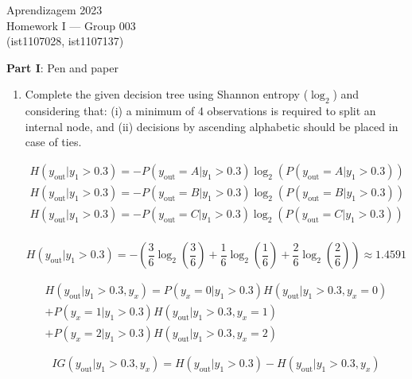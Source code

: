 \documentclass[12pt]{article}
\begin{document}
\begin{center}
Aprendizagem 2023\\
Homework I --- Group 003\\
(ist1107028, ist1107137)\vskip 1cm
\end{center}

\large{\textbf{Part I}: Pen and paper}\normalsize

\begin{enumerate}[leftmargin=\labelsep]
\item Complete the given decision tree using Shannon entropy ($\log_2$) and considering that:
    (i) a minimum of 4 observations is required to split an internal node, and (ii) decisions by ascending alphabetic should be placed in case of ties.

\begin{equation*}
    \begin{split}
        H(y_{\text{out}}|y_1 > 0.3) = - P(y_{\text{out}} = A|y_1 > 0.3)\log_2(P(y_{\text{out}} = A|y_1 > 0.3)) \\
        H(y_{\text{out}}|y_1 > 0.3) = - P(y_{\text{out}} = B|y_1 > 0.3)\log_2(P(y_{\text{out}} = B|y_1 > 0.3)) \\
        H(y_{\text{out}}|y_1 > 0.3) = - P(y_{\text{out}} = C|y_1 > 0.3)\log_2(P(y_{\text{out}} = C|y_1 > 0.3)) \\
    \end{split}
\end{equation*}

\begin{equation*}
    H(y_{\text{out}}|y_1 > 0.3) = - \left( \frac{3}{6} \log_2 \left( \frac{3}{6} \right) + \frac{1}{6} \log_2 \left( \frac{1}{6} \right) + \frac{2}{6} \log_2 \left( \frac{2}{6} \right) \right) \approx  1.4591
\end{equation*}

\begin{equation}
    \begin{split}
    H(y_{\text{out}} | y_1 > 0.3, y_x) = P(y_x = 0 | y_1 > 0.3) H(y_{\text{out}} | y_1 > 0.3, y_x = 0) \\
    + P(y_x = 1 | y_1 > 0.3) H(y_{\text{out}} | y_1 > 0.3, y_x = 1) \\
    + P(y_x = 2 | y_1 > 0.3) H(y_{\text{out}} | y_1 > 0.3, y_x = 2)
    \end{split}
\end{equation}

\begin{equation}
    IG(y_{\text{out}} | y_1 > 0.3, y_x) = H(y_{\text{out}} | y_1 > 0.3) - H(y_{\text{out}} | y_1 > 0.3, y_x)
\end{equation}


\end{enumerate}
\end{document}

